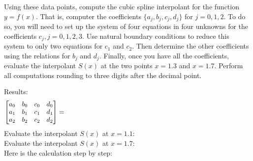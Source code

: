 Using these data points, compute the cubic spline interpolant for the function $y = f(x)$. That is,  computer the coefficients $\{a_{j}, b_{j}, c_{j}, d_{j}\}$ for $j = 0, 1, 2$. To do so, you will need to set up the system of four equations in four unknowns for  the coefficients $c_{j}, j = 0, 1, 2, 3$. Use natural boundary conditions to reduce this system to only two equations for $c_{1}$ and $c_{2}$. Then determine the other coefficients using the relations for $b_{j}$ and $d_{j}$. Finally, once you have all the coefficients, evaluate  the interpolant $S(x)$ at the two points $x = 1.3$ and $x = 1.7$. Perform all computations rounding to three digits after the decimal point.
\begin{solution}
  Results:
  \begin{equation*}
    \begin{bmatrix}
      a_{0} & b_{0} & c_{0} & d_{0} \\
      a_{1} & b_{1} & c_{1} & d_{1} \\
      a_{2} & b_{2} & c_{2} & d_{2} \\
    \end{bmatrix}
    =
    \hfill \hspace{10cm}  %
  \end{equation*}
  Evaluate the interpolant $S(x)$ at $x = 1.1$:
  \\[1cm]                 %

  Evaluate the interpolant $S(x)$ at $x = 1.7$:
  \\[1cm]                 %

  Here is the calculation step by step:
  \newpage \quad \vfill   %
\end{solution}

